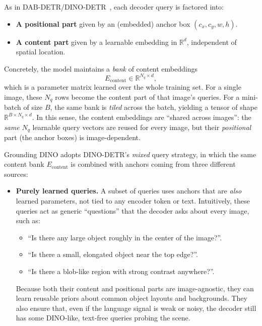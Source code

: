 \begin{enrichment}
\begin{enrichment}[Method][subsection]
		As in DAB-DETR/DINO-DETR~\cite{liu2022_dab_detr,zhang2022_dino}, each decoder query is factored into:
		\begin{itemize}
			\item \textbf{A positional part} given by an (embedded) anchor box \((c_x,c_y,w,h)\).
			\item \textbf{A content part} given by a learnable embedding in \(\mathbb{R}^d\), independent of spatial location.
		\end{itemize}
		Concretely, the model maintains a \emph{bank} of content embeddings
		\[
		E_{\text{content}} \in \mathbb{R}^{N_q \times d},
		\]
		which is a parameter matrix learned over the whole training set. For a single image, these \(N_q\) rows become the content part of that image’s queries. For a mini-batch of size \(B\), the same bank is \emph{tiled} across the batch, yielding a tensor of shape \(\mathbb{R}^{B \times N_q \times d}\). In this sense, the content embeddings are “shared across images”: the \emph{same} \(N_q\) learnable query vectors are reused for every image, but their \emph{positional} part (the anchor boxes) is image-dependent.
		
		Grounding DINO adopts DINO-DETR’s \emph{mixed} query strategy, in which the same content bank \(E_{\text{content}}\) is combined with anchors coming from three different sources:
		\begin{itemize}
			\item \textbf{Purely learned queries.}  
			A subset of queries uses anchors that are \emph{also} learned parameters, not tied to any encoder token or text. Intuitively, these queries act as generic “questions” that the decoder asks about every image, such as:
			\begin{itemize}
				\item “Is there any large object roughly in the center of the image?”.
				\item “Is there a small, elongated object near the top edge?”.
				\item “Is there a blob-like region with strong contrast anywhere?”.
			\end{itemize}
			Because both their content and positional parts are image-agnostic, they can learn reusable priors about common object layouts and backgrounds. They also ensure that, even if the language signal is weak or noisy, the decoder still has some DINO-like, text-free queries probing the scene.
			

\end{itemize}
\end{enrichment}
\end{enrichment}
